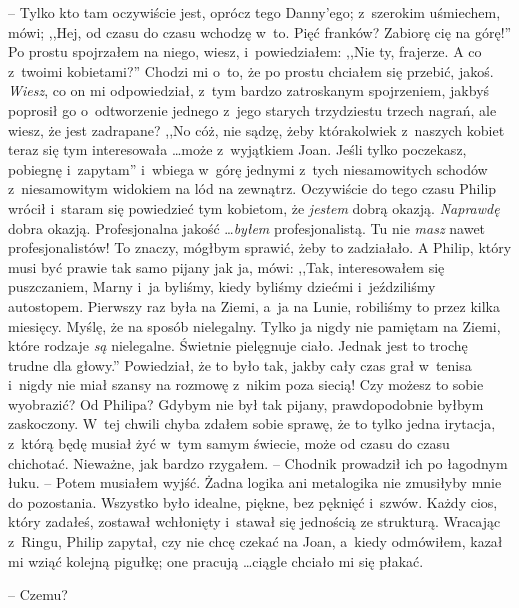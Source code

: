 \documentclass[oneside,polish,11pt,rmheadings]{mwbk}
\begin{document}
-- Tylko kto tam oczywiście jest, oprócz tego Danny'ego; z~szerokim uśmiechem, mówi; ,,Hej, od czasu do czasu wchodzę w~to. Pięć franków? Zabiorę cię na górę!'' Po prostu spojrzałem na niego, wiesz, i~powiedziałem: ,,Nie ty, frajerze. A co z~twoimi kobietami?'' Chodzi mi o~to, że po prostu chciałem się przebić, jakoś. \textit{Wiesz}, co on mi odpowiedział, z~tym bardzo zatroskanym spojrzeniem, jakbyś poprosił go o~odtworzenie jednego z~jego starych trzydziestu trzech nagrań, ale wiesz, że jest zadrapane? ,,No cóż, nie sądzę, żeby którakolwiek z~naszych kobiet teraz się tym interesowała \ldots  może z~wyjątkiem Joan. Jeśli tylko poczekasz, pobiegnę i~zapytam'' i~wbiega w~górę jednymi z~tych niesamowitych schodów z~niesamowitym widokiem na lód na zewnątrz. Oczywiście do tego czasu Philip wrócił i~staram się powiedzieć tym kobietom, że \textit{jestem }dobrą okazją. \textit{Naprawdę }dobra okazją. Profesjonalna jakość \ldots  \textit{byłem }profesjonalistą. Tu nie \textit{masz }nawet profesjonalistów! To znaczy, mógłbym sprawić, żeby to zadziałało. A Philip, który musi być prawie tak samo pijany jak ja, mówi: ,,Tak, interesowałem się puszczaniem, Marny i~ja byliśmy, kiedy byliśmy dziećmi i~jeździliśmy autostopem. Pierwszy raz była na Ziemi, a~ja na Lunie, robiliśmy to przez kilka miesięcy. Myślę, że na sposób nielegalny. Tylko ja nigdy nie pamiętam na Ziemi, które rodzaje \textit{są }nielegalne. Świetnie pielęgnuje ciało. Jednak jest to trochę trudne dla głowy.'' Powiedział, że to było tak, jakby cały czas grał w~tenisa i~nigdy nie miał szansy na rozmowę z~nikim poza siecią! Czy możesz to sobie wyobrazić? Od Philipa? Gdybym nie był tak pijany, prawdopodobnie byłbym zaskoczony. W~tej chwili chyba zdałem sobie sprawę, że to tylko jedna irytacja, z~którą będę musiał żyć w~tym samym świecie, może od czasu do czasu chichotać. Nieważne, jak bardzo rzygałem. -- Chodnik prowadził ich po łagodnym łuku. -- Potem musiałem wyjść. Żadna logika ani metalogika nie zmusiłyby mnie do pozostania. Wszystko było idealne, piękne, bez pęknięć i~szwów. Każdy cios, który zadałeś, zostawał wchłonięty i~stawał się jednością ze strukturą. Wracając z~Ringu, Philip zapytał, czy nie chcę czekać na Joan, a~kiedy odmówiłem, kazał mi wziąć kolejną pigułkę; one pracują  \ldots  ciągle chciało mi się płakać. 

-- Czemu? 
\end{document}
